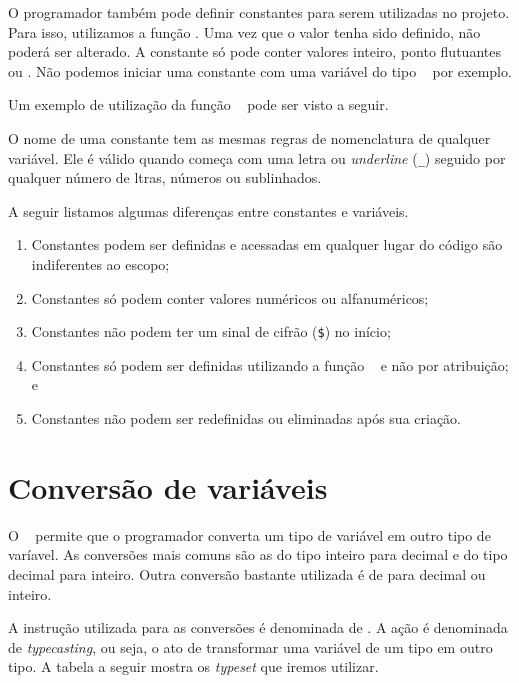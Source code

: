 O programador também pode definir constantes para serem utilizadas no projeto. Para isso,
utilizamos a função \funcaodefine. Uma vez que o valor tenha sido definido, não poderá
ser alterado. A constante só pode conter valores inteiro, ponto flutuantes ou \tipostring.
Não podemos iniciar uma constante com uma variável do tipo \tipoarray~ por exemplo.

Um exemplo de utilização da função \funcaodefine~ pode ser visto a seguir.




O nome de uma constante tem as mesmas regras de nomenclatura de qualquer variável.
Ele é válido quando começa com uma letra ou \textit{underline} (\texttt{\_}) seguido
por qualquer número de ltras, números ou sublinhados.

A seguir listamos algumas diferenças entre constantes e variáveis.

\begin{enumerate}
  \item Constantes podem ser definidas e acessadas em qualquer lugar do código são
  indiferentes ao escopo;
  \item Constantes só podem conter valores numéricos ou alfanuméricos;
  \item Constantes não podem ter um sinal de cifrão (\texttt{\$}) no início;
  \item Constantes só podem ser definidas utilizando a função \funcaodefine~ e não por atribuição; e
  \item Constantes não podem ser redefinidas ou eliminadas após sua criação.
\end{enumerate}

\section{Conversão de variáveis}
\label{conversao-de-variaveis}

O \php~ permite que o programador converta um tipo de variável em outro tipo de varíavel.
As conversões mais comuns são as do tipo inteiro para decimal e do tipo decimal para inteiro.
Outra conversão bastante utilizada é de \tipostring para decimal ou inteiro.

A instrução utilizada para as conversões é denominada de \funcaotypeset. A ação é denominada
de \textit{typecasting}, ou seja, o ato de transformar uma variável de um tipo em outro tipo. A
tabela a seguir mostra os \textit{typeset} que iremos utilizar.

